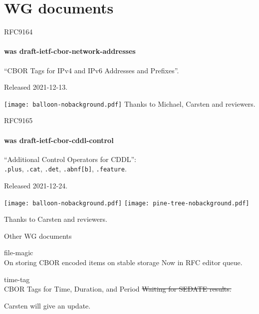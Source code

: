 \documentclass[aspectratio=169]{beamer}
\begin{document}
\section*{WG documents}

\begin{frame}{RFC9164}\Large
        \framesubtitle{was draft-ietf-cbor-network-addresses}

        ``CBOR Tags for IPv4 and IPv6 Addresses and Prefixes''.

        \bigskip

        Released 2021-12-13.

        \begin{block}{\texttt{[image: balloon-nobackground.pdf]}\mbox{\quad}}
                Thanks to Michael, Carsten and reviewers.
        \end{block}
\end{frame}

\begin{frame}{RFC9165}\Large
        \framesubtitle{was draft-ietf-cbor-cddl-control}

        ``Additional Control Operators for CDDL'':\\
        \texttt{.plus}, \texttt{.cat}, \texttt{.det}, \texttt{.abnf[b]}, \texttt{.feature}.

        \bigskip

        Released 2021-12-24.

        \vspace{-1.5cm}

        \begin{block}{
                \texttt{[image: balloon-nobackground.pdf]}\mbox{\quad}
                \texttt{[image: pine-tree-nobackground.pdf]}}

                \vspace{2cm}
                Thanks to Carsten and reviewers.
        \end{block}
\end{frame}

\begin{frame}{Other WG documents}\Large

    \begin{block}{\Large file-magic \\ \small On storing CBOR encoded items on stable storage}
        Now in RFC editor queue.
    \end{block}

    \bigskip

    \begin{block}{\Large time-tag \\ \small CBOR Tags for Time, Duration, and Period}
        \sout{Waiting for SEDATE results.}

        Carsten will give an update.
    \end{block}

\end{frame}
\end{document}
